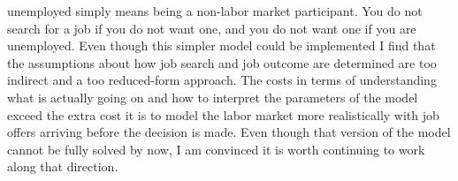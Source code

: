 unemployed simply means being a non-labor market participant. You do not search for a job if you do not want one, and you do not want one if you are unemployed. Even though this simpler model could be implemented I find that the assumptions about how job search and job outcome are determined are too indirect and a too reduced-form approach. The costs in terms of understanding what is actually going on and how to interpret the parameters of the model exceed the extra cost it is to model the labor market more realistically with job offers arriving before the decision is made. Even though that version of the model cannot be fully solved by now, I am convinced it is worth continuing to work along that direction.


